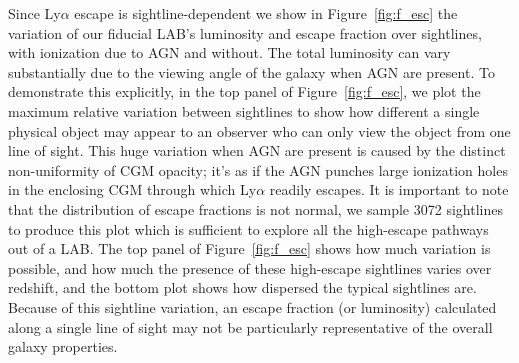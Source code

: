 Since Ly$\alpha$ escape is sightline-dependent we show in Figure~\ref{fig:f_esc} the variation of our fiducial LAB's luminosity and escape fraction over sightlines, with ionization due to AGN and without.
The total luminosity can vary substantially due to the viewing angle of the galaxy when AGN are present.
To demonstrate this explicitly, in the top panel of Figure~\ref{fig:f_esc}, we plot the maximum relative variation between sightlines to show how different a single physical object may appear to an observer who can only view the object from one line of sight.
This huge variation when AGN are present is caused by the distinct non-uniformity of CGM opacity; it's as if the AGN punches large ionization holes in the enclosing CGM through which Ly$\alpha$ readily escapes.
It is important to note that the distribution of escape fractions is not normal, we sample 3072 sightlines to produce this plot which is sufficient to explore all the high-escape pathways out of a LAB.
The top panel of Figure~\ref{fig:f_esc} shows how much variation is possible, and how much the presence of these high-escape sightlines varies over redshift, and the bottom plot shows how dispersed the typical sightlines are.
Because of this sightline variation, an escape fraction (or luminosity) calculated along a single line of sight may not be particularly representative of the overall galaxy properties.


